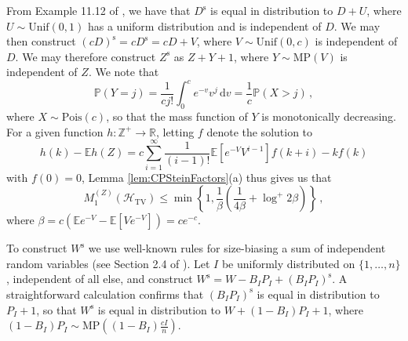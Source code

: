 \documentclass[12pt]{article}
\begin{document}
From Example 11.12 of \cite{arratia19}, we have that $D^\text{s}$ is equal in distribution to $D+U$, where $U\sim\text{Unif}(0,1)$ has a uniform distribution and is independent of $D$. We may then construct
$(cD)^\text{s}=cD^\text{s}=cD+V$, where $V\sim\text{Unif}(0,c)$ is independent of $D$. We may therefore construct $Z^\text{s}$ as $Z+Y+1$, where $Y\sim\text{MP}(V)$ is independent of $Z$. We note that 
\[
\mathbb{P}(Y=j)=\frac{1}{cj!}\int_0^ce^{-v}v^j\,\text{d}v=\frac{1}{c}\mathbb{P}(X>j)\,,
\]
where $X\sim\text{Pois}(c)$, so that the mass function of $Y$ is monotonically decreasing. For a given function $h:\mathbb{Z}^+\to\mathbb{R}$, letting $f$ denote the solution to
\[
h(k)-\mathbb{E}h(Z)=c\sum_{i=1}^\infty\frac{1}{(i-1)!}\mathbb{E}[e^{-V}V^{i-1}]f(k+i)-kf(k)
\]
with $f(0)=0$, Lemma \ref{lem:CPSteinFactors}(a) thus gives us that
\[
M_1^{(Z)}(\mathcal{H}_\text{TV})\leq\min\left\{1,\frac{1}{\beta}\left(\frac{1}{4\beta}+\log^+2\beta\right)\right\}\,,
\]
where $\beta=c(\mathbb{E}e^{-V}-\mathbb{E}[Ve^{-V}])=ce^{-c}$.

To construct $W^\text{s}$ we use well-known rules for size-biasing a sum of independent random variables (see Section 2.4 of \cite{arratia19}). Let $I$ be uniformly distributed on $\{1,\ldots,n\}$, independent of all else, and construct $W^\text{s}=W-B_IP_I+(B_IP_I)^\text{s}$. A straightforward calculation confirms that $(B_IP_I)^\text{s}$ is equal in distribution to $P_I+1$, so that $W^\text{s}$ is equal in distribution to $W+(1-B_I)P_I+1$, where $(1-B_I)P_I\sim\text{MP}((1-B_I)\frac{cI}{n})$.
\end{document}
